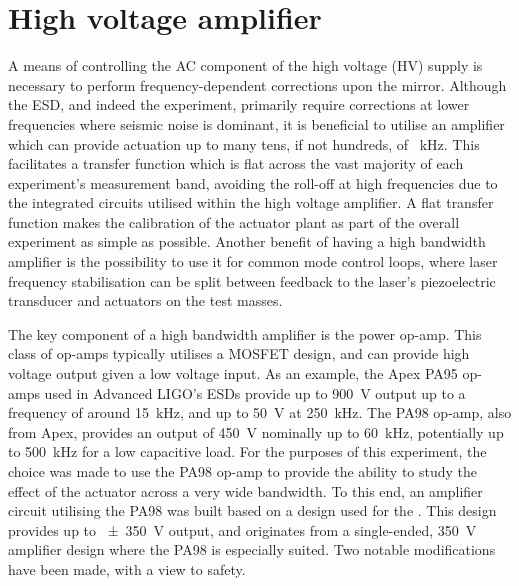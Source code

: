 \section{\label{sec:hv-amplifier}High voltage amplifier}

A means of controlling the \gls{AC} component of the high voltage (\gls{HV}) supply is necessary to perform frequency-dependent corrections upon the mirror. Although the \gls{ESD}, and indeed the \SSM{} experiment, primarily require corrections at lower frequencies where seismic noise is dominant, it is beneficial to utilise an amplifier which can provide actuation up to many tens, if not hundreds, of \SI{}{\kilo\hertz}. This facilitates a transfer function which is flat across the vast majority of each experiment's measurement band, avoiding the roll-off at high frequencies due to the integrated circuits utilised within the high voltage amplifier. A flat transfer function makes the calibration of the actuator plant as part of the overall experiment as simple as possible. Another benefit of having a high bandwidth amplifier is the possibility to use it for common mode control loops, where laser frequency stabilisation can be split between feedback to the laser's piezoelectric transducer and actuators on the test masses.

The key component of a high bandwidth amplifier is the power op-amp. This class of op-amps typically utilises a \gls{MOSFET} design, and can provide high voltage output given a low voltage input. As an example, the Apex PA95 op-amps used in Advanced LIGO's \glspl{ESD} provide up to \SI{900}{\volt} output up to a frequency of around \SI{15}{\kilo\hertz}, and up to \SI{50}{\volt} at \SI{250}{\kilo\hertz}. The PA98 op-amp, also from Apex, provides an output of \SI{450}{\volt} nominally up to \SI{60}{\kilo\hertz}, potentially up to \SI{500}{\kilo\hertz} for a low capacitive load. For the purposes of this experiment, the choice was made to use the PA98 op-amp to provide the ability to study the effect of the actuator across a very wide bandwidth. To this end, an amplifier circuit utilising the PA98 was built based on a design used for the \AEIPROTOTYPE{}. This design provides up to \SI{\pm350}{\volt} output, and originates from a single-ended, \SI{350}{\volt} amplifier design where the PA98 is especially suited. Two notable modifications have been made, with a view to safety.


